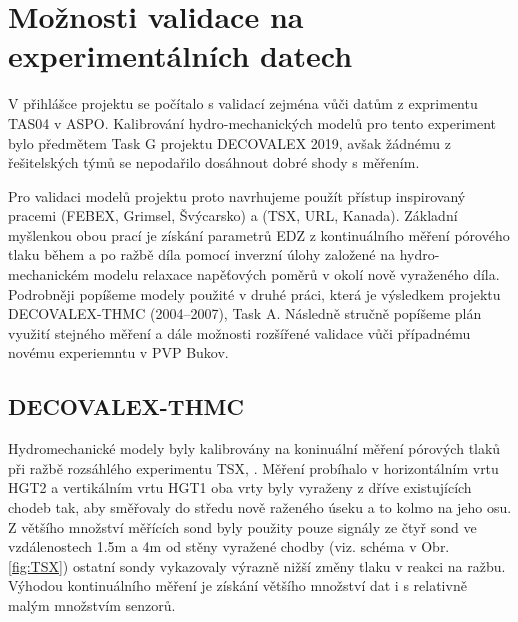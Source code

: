 \documentclass{article}
\begin{document}
\section{Možnosti validace na experimentálních datech}
\label{sec:experiment}


V přihlášce projektu se počítalo s validací zejména vůči datům z exprimentu TAS04 v ASPO. 
Kalibrování hydro-mechanických modelů pro tento experiment bylo předmětem Task G projektu DECOVALEX 2019, 
avšak žádnému z řešitelských týmů se nepodařilo dosáhnout dobré shody s měřením. 

Pro validaci modelů projektu proto navrhujeme použít přístup inspirovaný pracemi \cite{Rutqvist2004} (FEBEX, Grimsel, Švýcarsko) 
a \cite{Rutqvist2009} (TSX, URL, Kanada). Základní myšlenkou obou prací je získání parametrů EDZ z kontinuálního 
měření pórového tlaku během a po ražbě díla pomocí inverzní úlohy založené na hydro-mechanickém modelu relaxace napěťových 
poměrů v okolí nově vyraženého díla. Podrobněji popíšeme  modely použité v druhé práci, která je výsledkem projektu 
DECOVALEX-THMC (2004–2007), Task A. Následně stručně popíšeme plán využití stejného měření a dále možnosti rozšířené validace 
vůči případnému novému experiemntu v PVP Bukov.

\subsection{DECOVALEX-THMC}


Hydromechanické modely byly kalibrovány na koninuální měření pórových tlaků při ražbě rozsáhlého experimentu TSX, \cite{Chandler2002}.
Měření probíhalo v horizontálním vrtu HGT2 a vertikálním vrtu HGT1 oba vrty byly vyraženy z dříve existujících chodeb tak, aby směřovaly do středu nově raženého úseku a to kolmo na jeho osu. Z většího množství měřících sond byly použity pouze signály ze čtyř sond ve vzdálenostech 1.5m a 4m od stěny vyražené chodby (viz. schéma v Obr. \ref{fig:TSX}) ostatní sondy vykazovaly výrazně nižší změny tlaku v reakci na ražbu. Výhodou kontinuálního měření je získání většího množství dat i s relativně malým množstvím senzorů. 
\end{document}
